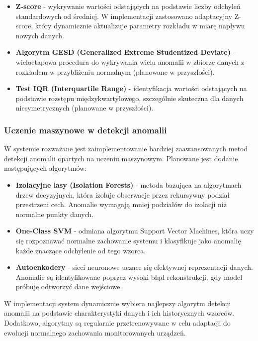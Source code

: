 \begin{itemize}
    \item \textbf{Z-score} - wykrywanie wartości odstających na podstawie liczby odchyleń standardowych od średniej. W implementacji zastosowano adaptacyjny Z-score, który dynamicznie aktualizuje parametry rozkładu w miarę napływu nowych danych.
    \item \textbf{Algorytm GESD (Generalized Extreme Studentized Deviate)} - wieloetapowa procedura do wykrywania wielu anomalii w zbiorze danych z rozkładem w przybliżeniu normalnym (planowane w przyszłości).
    \item \textbf{Test IQR (Interquartile Range)} - identyfikacja wartości odstających na podstawie rozstępu międzykwartylowego, szczególnie skuteczna dla danych niesymetrycznych (planowane w przyszłości).
\end{itemize}

\subsubsection{Uczenie maszynowe w detekcji anomalii}
\label{subsubsec:ml_anomalie}

W systemie rozważane jest zaimplementowanie bardziej zaawansowanych metod detekcji anomalii opartych na uczeniu maszynowym. Planowane jest dodanie następujących algorytmów:

\begin{itemize}
    \item \textbf{Izolacyjne lasy (Isolation Forests)} - metoda bazująca na algorytmach drzew decyzyjnych, która izoluje obserwacje przez rekursywny podział przestrzeni cech. Anomalie wymagają mniej podziałów do izolacji niż normalne punkty danych.
    \item \textbf{One-Class SVM} - odmiana algorytmu Support Vector Machines, która uczy się rozpoznawać normalne zachowanie systemu i klasyfikuje jako anomalię każde znaczące odchylenie od tego wzorca.
    \item \textbf{Autoenkodery} - sieci neuronowe uczące się efektywnej reprezentacji danych. Anomalie są identyfikowane poprzez wysoki błąd rekonstrukcji, gdy model próbuje odtworzyć dane wejściowe.
\end{itemize}

W implementacji system dynamicznie wybiera najlepszy algorytm detekcji anomalii na podstawie charakterystyki danych i ich historycznych wzorców. Dodatkowo, algorytmy są regularnie przetrenowywane w celu adaptacji do ewolucji normalnego zachowania monitorowanych urządzeń.

